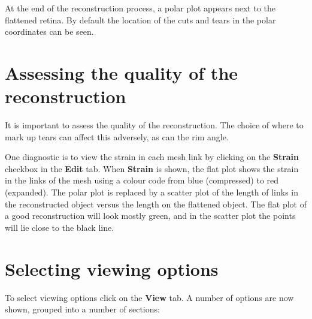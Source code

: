 \documentclass{book}
\begin{document}
At the end of the reconstruction process, a polar plot appears next to
the flattened retina. By default the location of
the cuts and tears in the polar coordinates can be seen.

\section{Assessing the quality of the reconstruction}
\label{retistruct-user-guide:sec:assess-qual-reconstr}

It is important to assess the quality of the reconstruction. The
choice of where to mark up tears can affect this adversely, as can the
rim angle.

One diagnostic is to view the strain in each mesh link by clicking on
the \textbf{Strain} checkbox in the \textbf{Edit} tab. When \textbf{Strain}
is shown, the flat plot shows the strain in the links of the mesh
using a colour code from blue (compressed) to red (expanded). The
polar plot is replaced by a scatter plot of the length of links in the
reconstructed object versus the length on the flattened object. The
flat plot of a good reconstruction will look mostly green, and in the
scatter plot the points will lie close to the black line.

\section{Selecting viewing options}
\label{retistruct-user-guide:sec:select-view-opti}

To select viewing options click on the \textbf{View} tab. A number of
options are now shown, grouped into a number of sections:
\end{document}
